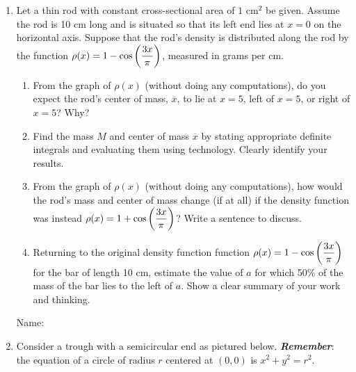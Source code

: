 \documentclass[11 pt]{article}
\newcommand{\ds}{\ensuremath{\displaystyle}}
\newcommand{\tr}{\vspace{0.5in}}
\newcommand{\mr}{\vspace{2.0in}}
\newcommand{\be}{\begin{enumerate}}
\newcommand{\ee}{\end{enumerate}}
\begin{document}
\begin{enumerate}



\item[7.]  Let a thin rod with constant cross-sectional area of $1$ cm$^2$ be given.  Assume the rod is 10 cm long and is situated so that its left end lies at $x = 0$ on the horizontal axis.  Suppose that the rod's density is distributed along the rod by the function $\ds \rho(x) = 1 - \cos \left(\frac{3x}{\pi}\right)$, measured in grams per cm.

	\be
		\item From the graph of $\rho(x)$ (without doing any computations), do you expect the rod's center of mass, $\overline{x}$, to lie at $x = 5$, left of $x = 5$, or right of $x = 5$?  Why?
		
		\tr \tr
		
		\item Find the mass $M$ and center of mass $\overline{x}$ by stating appropriate definite integrals and evaluating them using technology.  Clearly identify your results.
		
		\mr \tr
		
		\item From the graph of $\rho(x)$ (without doing any computations), how would the rod's mass and center of mass change (if at all) if the density function was instead $\ds \rho(x) = 1 + \cos \left(\frac{3x}{\pi}\right)$?  Write a sentence to discuss.
		
		\tr \tr
		
		\item Returning to the original density function function $\ds \rho(x) = 1 - \cos \left(\frac{3x}{\pi}\right)$ for the bar of length 10 cm, estimate the value of $a$ for which 50\% of the mass of the bar lies to the left of $a$.  Show a clear summary of your work and thinking. 
	\ee	

\pagebreak

\noindent Name: \\ 


\item[8.] Consider a trough with a semicircular end as pictured below.  {\bf \emph{Remember}}: the equation of a circle of radius $r$ centered at $(0,0)$ is $x^2 + y^2 = r^2$.



\end{enumerate}
\end{document}
